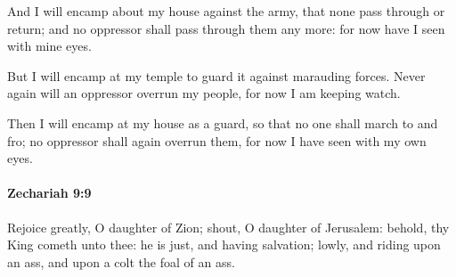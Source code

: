 			\begin{versebox}
					\item[BHS] 
					\item[LXX] 
					\item[ASV] And I will encamp about my house against the army, that none pass through or return; and no oppressor shall pass through them any more: for now have I seen with mine eyes.
					\item[NIV] But I will encamp at my temple to guard it against marauding forces. Never again will an oppressor overrun my people, for now I am keeping watch.
					\item[NRSV] Then I will encamp at my house as a guard, so that no one shall march to and fro; no oppressor shall again overrun them, for now I have seen with my own eyes.
			\end{versebox}

		\paragraph{Zechariah 9:9} %
			\label{ZECHARIAH-9-9}

			Rejoice greatly, O daughter of Zion; shout, O daughter of Jerusalem: behold, thy King cometh unto thee: he is just, and having salvation; lowly, and riding upon an ass, and upon a colt the foal of an ass.

